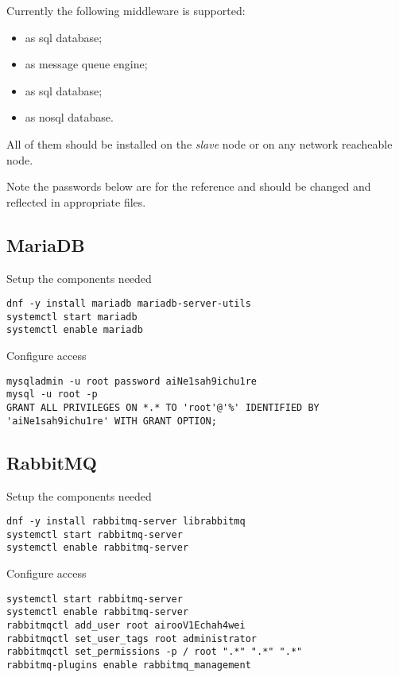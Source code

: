 Currently the following middleware is supported:
\begin{itemize}
\item{ as sql database;}
\item{ as message queue engine;}
\item{ as sql database;}
\item{ as nosql database.}
\end{itemize}

All of them should be installed on the \emph{slave} node or on any
network reacheable node.

Note the passwords below are for the reference and should be changed
and reflected in appropriate  files.

\subsection{MariaDB}
\label{subsec:setup-mware-mariadb}

Setup the components needed

\begin{lstlisting}
dnf -y install mariadb mariadb-server-utils
systemctl start mariadb
systemctl enable mariadb
\end{lstlisting}

Configure access

\begin{lstlisting}
mysqladmin -u root password aiNe1sah9ichu1re
mysql -u root -p
GRANT ALL PRIVILEGES ON *.* TO 'root'@'%' IDENTIFIED BY 'aiNe1sah9ichu1re' WITH GRANT OPTION;
\end{lstlisting}

\subsection{RabbitMQ}
\label{subsec:setup-mware-rabbitmq}

Setup the components needed

\begin{lstlisting}
dnf -y install rabbitmq-server librabbitmq
systemctl start rabbitmq-server
systemctl enable rabbitmq-server
\end{lstlisting}

Configure access

\begin{lstlisting}
systemctl start rabbitmq-server
systemctl enable rabbitmq-server
rabbitmqctl add_user root airooV1Echah4wei
rabbitmqctl set_user_tags root administrator
rabbitmqctl set_permissions -p / root ".*" ".*" ".*"
rabbitmq-plugins enable rabbitmq_management
\end{lstlisting}

